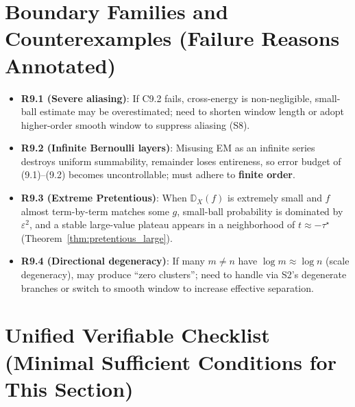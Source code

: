 \documentclass[11pt,a4paper]{article}
\theoremstyle{remark}
\begin{document}
\section{Boundary Families and Counterexamples (Failure Reasons Annotated)}

\begin{itemize}
\item \textbf{R9.1 (Severe aliasing)}: If C9.2 fails, cross-energy is non-negligible, small-ball estimate may be overestimated; need to shorten window length or adopt higher-order smooth window to suppress aliasing (S8).

\item \textbf{R9.2 (Infinite Bernoulli layers)}: Misusing EM as an infinite series destroys uniform summability, remainder loses entireness, so error budget of (9.1)--(9.2) becomes uncontrollable; must adhere to \textbf{finite order}.

\item \textbf{R9.3 (Extreme Pretentious)}: When $\mathbb{D}_X(f)$ is extremely small and $f$ almost term-by-term matches some $g$, small-ball probability is dominated by $\varepsilon^2$, and a stable large-value plateau appears in a neighborhood of $t\approx -\tau^\star$ (Theorem~\ref{thm:pretentious_large}).

\item \textbf{R9.4 (Directional degeneracy)}: If many $m\ne n$ have $\log m\approx\log n$ (scale degeneracy), may produce ``zero clusters''; need to handle via S2's degenerate branches or switch to smooth window to increase effective separation.
\end{itemize}

\section{Unified Verifiable Checklist (Minimal Sufficient Conditions for This Section)}
\end{document}
